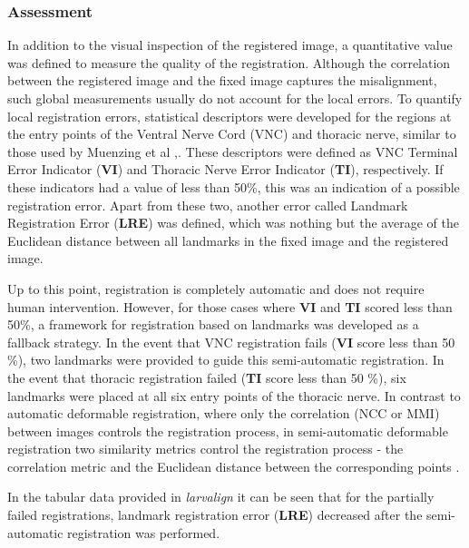 \documentclass{book}
\begin{document}
	\subsubsection{Assessment}
	\label{subsubsection:assessment}
	In addition to the visual inspection of the registered image, a quantitative value was defined to measure the quality of the registration. Although the correlation between the registered image and the fixed image captures the misalignment, such global measurements usually do not account for the local errors. To quantify local registration errors, statistical descriptors were developed for the regions at the entry points of the Ventral Nerve Cord (VNC) and thoracic nerve, similar to those used by Muenzing et al \cite{Muenzing},. These descriptors were defined as VNC Terminal Error Indicator (\textbf{VI}) and Thoracic Nerve Error Indicator (\textbf{TI}), respectively. If these indicators had a value of less than 50\%, this was an indication of a possible registration error. Apart from these two, another error called Landmark Registration Error (\textbf{LRE}) was defined, which was nothing but the average of the Euclidean distance between all landmarks in the fixed image and the registered image.
	
	Up to this point, registration is completely automatic and does not require human intervention. However, for those cases where \textbf{VI} and \textbf{TI} scored less than 50\%, a framework for registration based on landmarks was developed as a fallback strategy. In the event that VNC registration fails (\textbf{VI} score less than 50 \%), two landmarks were provided to guide this semi-automatic registration. In the event that thoracic registration failed (\textbf{TI} score less than 50 \%), six landmarks were placed at all six entry points of the thoracic nerve.	In contrast to automatic deformable registration, where only the correlation (NCC or MMI) between images controls the registration process, in semi-automatic deformable registration two similarity metrics control the registration process - the correlation metric and the Euclidean distance between the corresponding points \cite{inproceedings}.
	
	In the tabular data provided in \textit{larvalign} \cite{larvalign} it can be seen that for the partially failed registrations, landmark registration error (\textbf{LRE}) decreased after the semi-automatic registration was performed.
	
\end{document}
